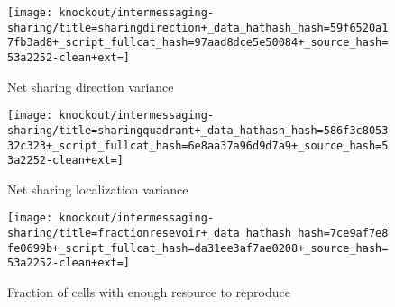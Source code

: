 \begin{figure*}[!htbp]
\begin{center}
\begin{minipage}[t]{\columnwidth}
\end{minipage}%
\begin{minipage}[t]{\columnwidth}

\hspace*{\fill}%
\begin{minipage}[t]{\textwidth}
\centering
\vspace{0pt} %
\begin{subfigure}[b]{\textwidth}
\texttt{[image: knockout/intermessaging-sharing/title=sharingdirection+\_data\_hathash\_hash=59f6520a17fb3ad8+\_script\_fullcat\_hash=97aad8dce5e50084+\_source\_hash=53a2252-clean+ext=]}%
\caption{Net sharing direction variance}
\label{fig:intermessaging-sharing-direction}
\end{subfigure}
\end{minipage}%
\hfill
\begin{minipage}[t]{\textwidth}
\centering
\vspace{0pt} %
\begin{subfigure}[b]{\textwidth}
\texttt{[image: knockout/intermessaging-sharing/title=sharingquadrant+\_data\_hathash\_hash=586f3c805332c323+\_script\_fullcat\_hash=6e8aa37a96d9d7a9+\_source\_hash=53a2252-clean+ext=]}%
\caption{Net sharing localization variance}
\label{fig:intermessaging-sharing-quadrant}
\end{subfigure}
\end{minipage}%
\hfill
\begin{minipage}[t]{\textwidth}
\centering
\vspace{0pt} %
\begin{subfigure}[b]{\textwidth}
\texttt{[image: knockout/intermessaging-sharing/title=fractionresevoir+\_data\_hathash\_hash=7ce9af7e8fe0699b+\_script\_fullcat\_hash=da31ee3af7ae0208+\_source\_hash=53a2252-clean+ext=]}%
\caption{Fraction of cells with enough resource to reproduce}
\label{fig:intermessaging-sharing-resevoir}
\end{subfigure}
\end{minipage}%
\hspace*{\fill}
\end{minipage}

\caption{
Comparison of a wild type strain evolved under the ``Flat-Wave'' treatment and corresponding intercell messaging knockout strain.
Subfigure \ref{fig:intermessaging-sharing-phen} visualizes phenotypic traits in the wild type and knockout strain.
In the messaging visualization, color coding represents the volume of incoming messages.
White represents no incoming messages and the magenta to blue gradient runs from one incoming message to the maximum observed incoming message traffic.
In the resource sharing visualization, color coding represents the amount of incoming resource.
Black borders divide level-zero same-channel signaling networks.
Subfigures \ref{fig:intermessaging-sharing-direction}, \ref{fig:intermessaging-sharing-quadrant}, \ref{fig:intermessaging-sharing-resevoir} quantify knockout effects on various phenotypic traits.
Error bars indicate 95\% confidence.
}
\label{fig:ko-intermessaging-sharing}
\end{center}
\end{figure*}
